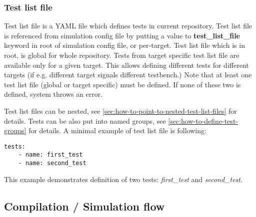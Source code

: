 \documentclass{tropic_design_spec}
\begin{document}
\subsubsection{Test list file}
\label{sec:test-list-file}

Test list file is a YAML file which defines tests in current repository.
Test list file is referenced from simulation config file by putting a value to
\textbf{test_list_file} keyword in root of simulation config file, or per-target. Test
list file which is in root, is global for whole repository. Tests from target specific
test list file are available only for a given target. This allows defining different
tests for different targets (if e.g. different target signals different testbench.)
Note that at least one test list file (global or target specific) must be defined.
If none of these two is defined, system throws an error.

Test list files can be nested, see \ref{sec:how-to-point-to-nested-test-list-files}
for details. Tests can be also put into named groups, see
\ref{sec:how-to-define-test-groups} for details. A minimal example of test list file
is following:

\begin{lstlisting}
tests:
    - name: first_test
    - name: second_test
\end{lstlisting}

This example demonstrates definition of two tests: \textit{first_test} and
\textit{second_test}.



\subsection{Compilation / Simulation flow}
\label{sec:compilation-simulation-flow}
\end{document}
